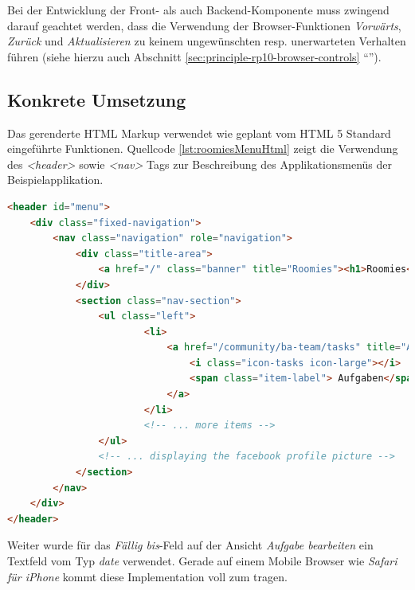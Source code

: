 Bei der Entwicklung der Front- als auch Backend-Komponente muss zwingend darauf geachtet werden, dass die Verwendung der Browser-Funktionen \emph{Vorwärts}, \emph{Zurück} und \emph{Aktualisieren} zu keinem ungewünschten resp. unerwarteten Verhalten führen (siehe hierzu auch Abschnitt \ref{sec:principle-rp10-browser-controls} ``'').


\subsection*{Konkrete Umsetzung}

Das gerenderte HTML Markup verwendet wie geplant vom HTML 5 Standard eingeführte Funktionen. Quellcode \ref{lst:roomiesMenuHtml} zeigt die Verwendung des \emph{<header>} sowie \emph{<nav>} Tags zur Beschreibung des Applikationsmenüs der Beispielapplikation.

\begin{lstlisting}[language=HTML, caption={Ausschnitt des gerenderten HTML Markups der Menüleiste \emph{roomies}}, label={lst:roomiesMenuHtml}]
<header id="menu">
	<div class="fixed-navigation">
		<nav class="navigation" role="navigation">
			<div class="title-area">
				<a href="/" class="banner" title="Roomies"><h1>Roomies</h1></a>
			</div>
			<section class="nav-section">
				<ul class="left">
						<li>
							<a href="/community/ba-team/tasks" title="Aufgaben">
								<i class="icon-tasks icon-large"></i>
								<span class="item-label"> Aufgaben</span>
							</a>
						</li>
						<!-- ... more items -->
				</ul>
				<!-- ... displaying the facebook profile picture -->
			</section>
		</nav>
	</div>
</header>
\end{lstlisting}

Weiter wurde für das \emph{Fällig bis}-Feld auf der Ansicht \emph{Aufgabe bearbeiten} ein Textfeld vom Typ \emph{date} verwendet. Gerade auf einem Mobile Browser wie \emph{Safari für iPhone} kommt diese Implementation voll zum tragen.

